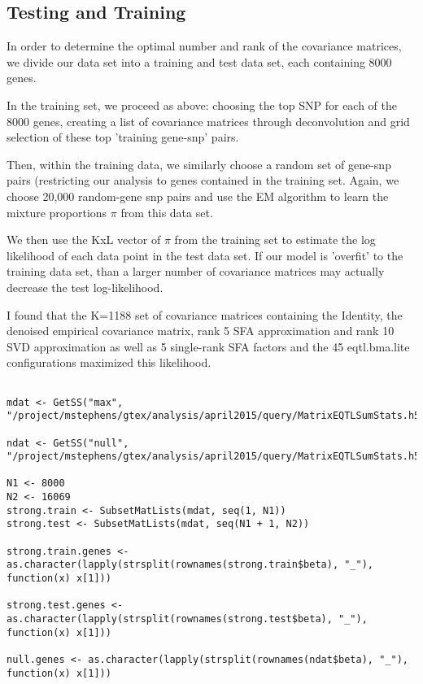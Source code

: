 \documentclass[10pt]{article}
\begin{document}
\begin{itemize}
\section{Testing and Training}

In order to determine the optimal number and rank of the covariance matrices, we divide our data set into a training and test data set, each containing 8000 genes.

In the training set, we proceed as above: choosing the top SNP for each of the 8000 genes, creating a list of covariance matrices through deconvolution and grid selection of these top 'training gene-snp' pairs. 

Then, within the training data, we similarly choose a random set of gene-snp pairs (restricting our analysis to genes contained in the training set. Again, we choose 20,000 random-gene snp pairs and use the EM algorithm to learn the mixture proportions $\pi$  from this data set.

We then use the KxL vector of $\pi$ from the training set to estimate the log likelihood of each data point in the test data set. If our model is 'overfit' to the training data set, than a larger number of covariance matrices may actually decrease the test log-likelihood. 

I found that the K=1188 set of covariance matrices containing the Identity, the denoised empirical covariance matrix, rank 5 SFA approximation and rank 10 SVD approximation as well as 5 single-rank SFA factors and the 45 eqtl.bma.lite configurations maximized this likelihood.


\begin{verbatim}

mdat <- GetSS("max", "/project/mstephens/gtex/analysis/april2015/query/MatrixEQTLSumStats.h5")

ndat <- GetSS("null", "/project/mstephens/gtex/analysis/april2015/query/MatrixEQTLSumStats.h5")

N1 <- 8000
N2 <- 16069
strong.train <- SubsetMatLists(mdat, seq(1, N1))
strong.test <- SubsetMatLists(mdat, seq(N1 + 1, N2))

strong.train.genes <- as.character(lapply(strsplit(rownames(strong.train$beta), "_"), function(x) x[1])) 

strong.test.genes <- as.character(lapply(strsplit(rownames(strong.test$beta), "_"), function(x) x[1]))

null.genes <- as.character(lapply(strsplit(rownames(ndat$beta), "_"), function(x) x[1]))



\end{verbatim}
\end{itemize}
\end{document}

